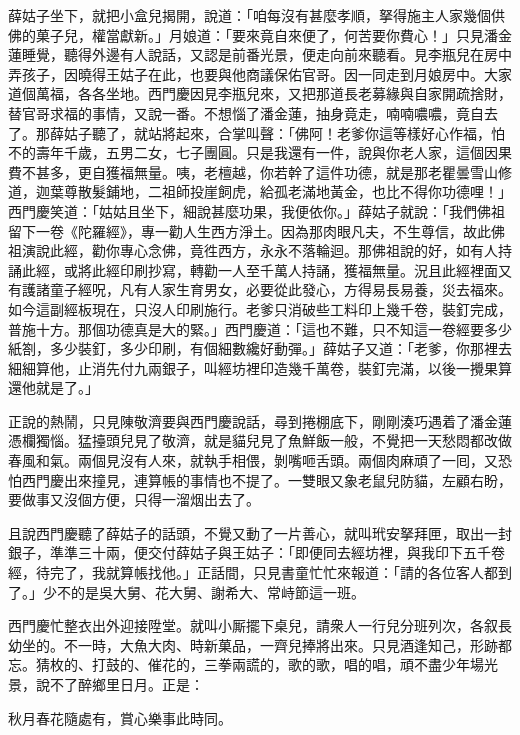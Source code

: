 薛姑子坐下，就把小盒兒揭開，說道：「咱每沒有甚麼孝順，拏得施主人家幾個供佛的菓子兒，權當獻新。」月娘道：「要來竟自來便了，何苦要你費心！」只見潘金蓮睡覺，聽得外邊有人說話，又認是前番光景，便走向前來聽看。見李瓶兒在房中弄孩子，因曉得王姑子在此，也要與他商議保佑官哥。因一同走到月娘房中。大家道個萬福，各各坐地。西門慶因見李瓶兒來，又把那道長老募緣與自家開疏捨財，替官哥求福的事情，又說一番。不想惱了潘金蓮，抽身竟走，喃喃噥噥，竟自去了。那薛姑子聽了，就站將起來，合掌叫聲：「佛阿！老爹你這等樣好心作福，怕不的壽年千歲，五男二女，七子團圓。只是我還有一件，說與你老人家，這個因果費不甚多，更自獲福無量。咦，老檀越，你若幹了這件功德，就是那老瞿曇雪山修道，迦葉尊散髮鋪地，二祖師投崖飼虎，給孤老滿地黃金，也比不得你功德哩！」西門慶笑道：「姑姑且坐下，細說甚麼功果，我便依你。」薛姑子就說：「我們佛祖留下一卷《陀羅經》，專一勸人生西方淨土。因為那肉眼凡夫，不生尊信，故此佛祖演說此經，勸你專心念佛，竟徃西方，永永不落輪迴。那佛祖說的好，如有人持誦此經，或將此經印刷抄寫，轉勸一人至千萬人持誦，獲福無量。況且此經裡面又有護諸童子經呪，凡有人家生育男女，必要從此發心，方得易長易養，災去福來。如今這副經板現在，只沒人印刷施行。老爹只消破些工料印上幾千卷，裝釘完成，普施十方。那個功德真是大的緊。」西門慶道：「這也不難，只不知這一卷經要多少紙劄，多少裝釘，多少印刷，有個細數纔好動彈。」薛姑子又道：「老爹，你那裡去細細算他，{}止消先付九兩銀子，叫經坊裡印造幾千萬卷，裝釘完滿，以後一攪果算還他就是了。」

正說的熱鬧，只見陳敬濟要與西門慶說話，尋到捲棚底下，剛剛湊巧遇着了潘金蓮憑欄獨惱。猛擡頭兒見了敬濟，就是貓兒見了魚鮮飯一般，不覺把一天愁悶都改做春風和氣。{}兩個見沒有人來，就執手相偎，剝嘴咂舌頭。兩個肉麻頑了一囘，又恐怕西門慶出來撞見，連算帳的事情也不提了。一雙眼又象老鼠兒防貓，左顧右盼，要做事又沒個方便，{}只得一溜烟出去了。

且說西門慶聽了薛姑子的話頭，不覺又動了一片善心，就叫玳安拏拜匣，取出一封銀子，準準三十兩，便交付薛姑子與王姑子：「即便同去經坊裡，與我印下五千卷經，待完了，我就算帳找他。」正話間，只見書童忙忙來報道：「請的各位客人都到了。」少不的是吳大舅、花大舅、謝希大、常峙節這一班。

西門慶忙整衣出外迎接陞堂。就叫小厮擺下桌兒，請衆人一行兒分班列次，各叙長幼坐的。不一時，大魚大肉、時新菓品，一齊兒捧將出來。只見酒逢知己，形跡都忘。猜枚的、打鼓的、催花的，三拳兩謊的，歌的歌，唱的唱，頑不盡少年場光景，說不了醉鄉里日月。{}正是：

\begin{myquote} 
秋月春花隨處有，賞心樂事此時同。
\end{myquote} 

